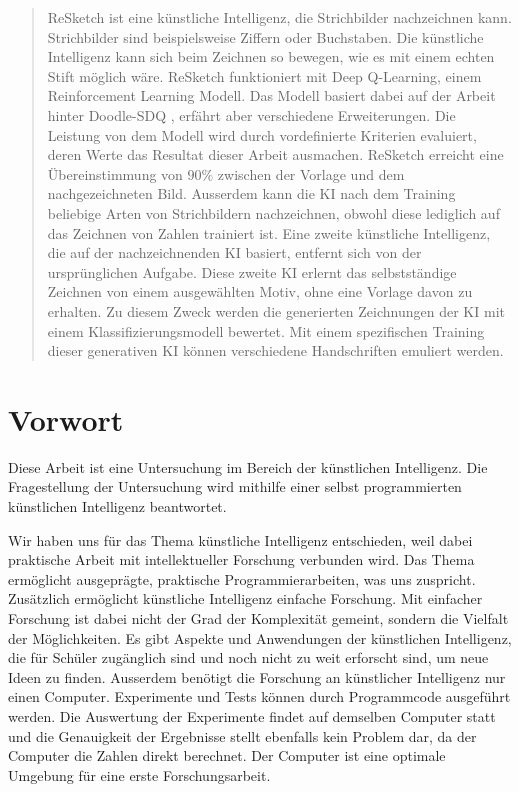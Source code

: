 \begin{abstract}\label{abstract} ReSketch ist eine künstliche Intelligenz, die
Strichbilder nachzeichnen kann. Strichbilder sind beispielsweise Ziffern oder
Buchstaben. Die künstliche Intelligenz kann sich beim Zeichnen so bewegen, wie
es mit einem echten Stift möglich wäre. ReSketch funktioniert mit Deep
Q-Learning, einem Reinforcement Learning Modell. Das Modell basiert dabei auf
der Arbeit hinter Doodle-SDQ \cite{zhou_learning_2018}, erfährt aber
verschiedene Erweiterungen. Die Leistung von dem Modell wird durch vordefinierte
Kriterien evaluiert, deren Werte das Resultat dieser Arbeit ausmachen. ReSketch
erreicht eine Übereinstimmung von $90\%$ zwischen der Vorlage und dem
nachgezeichneten Bild. Ausserdem kann die KI nach dem Training beliebige Arten
von Strichbildern nachzeichnen, obwohl diese lediglich auf das Zeichnen von
Zahlen trainiert ist. Eine zweite künstliche Intelligenz, die auf der
nachzeichnenden KI basiert, entfernt sich von der ursprünglichen Aufgabe. Diese
zweite KI erlernt das selbstständige Zeichnen von einem ausgewählten Motiv, ohne
eine Vorlage davon zu erhalten. Zu diesem Zweck werden die generierten
Zeichnungen der KI mit einem Klassifizierungsmodell bewertet. Mit einem
spezifischen Training dieser generativen KI können verschiedene Handschriften
emuliert werden.

\end{abstract}

    
\newpage
    
\section*{Vorwort}\label{vorwort} Diese Arbeit ist eine Untersuchung im Bereich
der künstlichen Intelligenz. Die Fragestellung der Untersuchung wird mithilfe
einer selbst programmierten künstlichen Intelligenz beantwortet.
    
Wir haben uns für das Thema künstliche Intelligenz entschieden, weil dabei
praktische Arbeit mit intellektueller Forschung verbunden wird. Das Thema
ermöglicht ausgeprägte, praktische Programmierarbeiten, was uns zuspricht.
Zusätzlich ermöglicht künstliche Intelligenz einfache Forschung. Mit einfacher
Forschung ist dabei nicht der Grad der Komplexität gemeint, sondern die Vielfalt
der Möglichkeiten. Es gibt Aspekte und Anwendungen der künstlichen Intelligenz,
die für Schüler zugänglich sind und noch nicht zu weit erforscht sind, um neue
Ideen zu finden. Ausserdem benötigt die Forschung an künstlicher Intelligenz nur
einen Computer. Experimente und Tests können durch Programmcode ausgeführt
werden. Die Auswertung der Experimente findet auf demselben Computer statt und
die Genauigkeit der Ergebnisse stellt ebenfalls kein Problem dar, da der
Computer die Zahlen direkt berechnet. Der Computer ist eine optimale Umgebung
für eine erste Forschungsarbeit.
    
